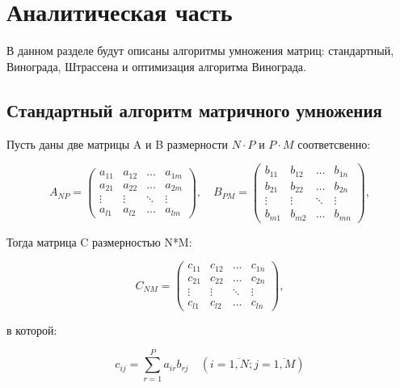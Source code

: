 \chapter{Аналитическая часть}

В данном разделе будут описаны алгоритмы умножения матриц: стандартный, Винограда, Штрассена и оптимизация алгоритма Винограда.

\section{Стандартный алгоритм матричного умножения}

Пусть даны две матрицы A и B размерности $N \cdot P$ и $P \cdot M$ соответсвенно:

\begin{equation}
	A_{NP} = \begin{pmatrix}
		a_{11} & a_{12} & \ldots & a_{1m}\\
		a_{21} & a_{22} & \ldots & a_{2m}\\
		\vdots & \vdots & \ddots & \vdots\\
		a_{l1} & a_{l2} & \ldots & a_{lm}
	\end{pmatrix},
	\quad
	B_{PM} = \begin{pmatrix}
		b_{11} & b_{12} & \ldots & b_{1n}\\
		b_{21} & b_{22} & \ldots & b_{2n}\\
		\vdots & \vdots & \ddots & \vdots\\
		b_{m1} & b_{m2} & \ldots & b_{mn}
	\end{pmatrix},
\end{equation}

Тогда матрица C размерностью N*M:

\begin{equation}
	C_{NM} = \begin{pmatrix}
		c_{11} & c_{12} & \ldots & c_{1n}\\
		c_{21} & c_{22} & \ldots & c_{2n}\\
		\vdots & \vdots & \ddots & \vdots\\
		c_{l1} & c_{l2} & \ldots & c_{ln}
	\end{pmatrix},
\end{equation}

в которой:

\begin{equation}
	\label{eq:M}
	c_{ij} =
	\sum_{r=1}^{P} a_{ir}b_{rj} \quad (i=\overline{1,N}; j=\overline{1,M})
\end{equation}

